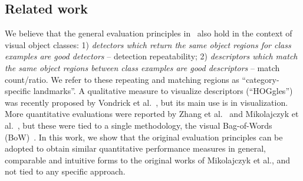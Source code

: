 \documentclass[review]{elsarticle}
\begin{document}
%
\subsection{Related work}
%


We believe that the general evaluation principles in~\cite{MikTuySch:2005,MikSch:2005} also hold in
the context of visual object classes: 1) \textit{detectors which return the same object regions for class
examples are good detectors} -- detection repeatability; 2)
\textit{descriptors which match the same object regions between class examples are good descriptors} -- match count/ratio. We refer to these repeating and matching regions as
``category-specific landmarks''. A qualitative measure to visualize
descriptors (``HOGgles'') was recently proposed by Vondrick et al.~\cite{VonKhoMal:2013},
but its main use is in visualization. More
quantitative evaluations were reported by Zhang et al.~\cite{ZhaMarLaz:2006}
and Mikolajczyk et al.~\cite{MikLeiSch:2005}, but these were
tied to a single methodology, the visual
Bag-of-Words (BoW)~\cite{SivZis:2003,CsuDanWil:2004}.
In this work, we show that the original evaluation principles can 
be adopted to obtain similar quantitative performance measures in general,
comparable and intuitive forms to the original works of Mikolajczyk et al., and not
tied to any specific approach.


%
\end{document}
